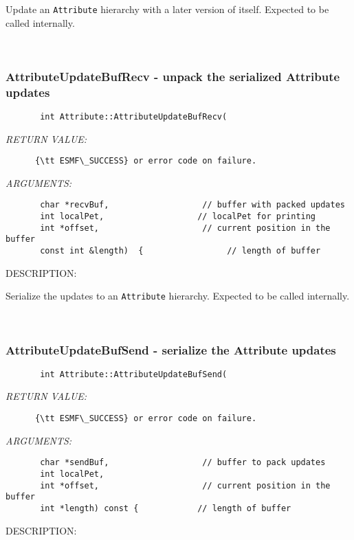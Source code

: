       Update an {\tt Attribute} hierarchy with a later version of itself.  
      Expected to be called internally.
   
 
\mbox{}\hrulefill\
 
\subsubsection [AttributeUpdateBufRecv] {AttributeUpdateBufRecv - unpack the serialized Attribute updates}


  
\begin{verbatim}       int Attribute::AttributeUpdateBufRecv(\end{verbatim}{\em RETURN VALUE:}
\begin{verbatim}      {\tt ESMF\_SUCCESS} or error code on failure.\end{verbatim}{\em ARGUMENTS:}
\begin{verbatim}       char *recvBuf,                   // buffer with packed updates
       int localPet,                   // localPet for printing
       int *offset,                     // current position in the buffer
       const int &length)  {                 // length of buffer\end{verbatim}
{\sf DESCRIPTION:\\ }


      Serialize the updates to an {\tt Attribute} hierarchy.  
      Expected to be called internally.
   
 
\mbox{}\hrulefill\
 
\subsubsection [AttributeUpdateBufSend] {AttributeUpdateBufSend - serialize the Attribute updates}


  
\begin{verbatim}       int Attribute::AttributeUpdateBufSend(\end{verbatim}{\em RETURN VALUE:}
\begin{verbatim}      {\tt ESMF\_SUCCESS} or error code on failure.\end{verbatim}{\em ARGUMENTS:}
\begin{verbatim}       char *sendBuf,                   // buffer to pack updates
       int localPet,
       int *offset,                     // current position in the buffer
       int *length) const {            // length of buffer\end{verbatim}
{\sf DESCRIPTION:\\ }


